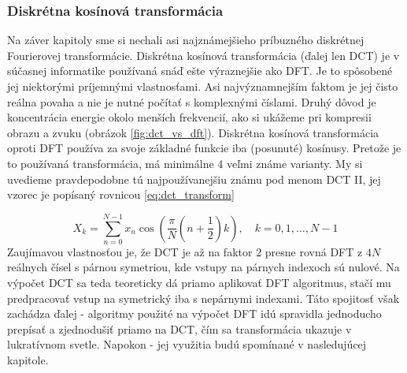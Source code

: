 \subsubsection{Diskrétna kosínová transformácia}
Na záver kapitoly sme si nechali asi najznámejšieho príbuzného
diskrétnej Fourierovej transformácie. Diskrétna kosínová transformácia
(ďalej len DCT) je v súčasnej informatike používaná snáď ešte
výraznejšie ako DFT. Je to spôsobené jej niektorými príjemnými
vlastnosťami. Asi najvýznamnejším faktom je jej čisto reálna
povaha a nie je nutné počítať s komplexnými číslami.
Druhý dôvod je koncentrácia energie okolo menších frekvencií, ako si
ukážeme pri kompresii obrazu a zvuku (obrázok \ref{fig:dct_vs_dft}).
Diskrétna kosínová transformácia oproti DFT používa za svoje
základné funkcie iba (posunuté) kosínusy.
Pretože je to používaná transformácia, má minimálne 4 veľmi známe
varianty. My si uvedieme pravdepodobne tú najpoužívanejšiu známu pod
menom DCT II, jej vzorec je popísaný rovnicou \eqref{eq:dct_transform}

\begin{equation}
    X_k = \sum_{n=0}^{N-1} x_n \cos (\frac{\pi}{N} (n + \frac{1}{2}) k),
    \quad k=0,1,\dots,N-1
    \label{eq:dct_transform}
\end{equation}
Zaujímavou vlastnosťou je, že DCT je až na faktor 2 presne rovná DFT z
$4N$ reálnych čísel s párnou symetriou, kde vstupy na párnych indexoch
sú nulové. Na výpočet DCT sa teda teoreticky dá priamo aplikovať DFT
algoritmus, stačí mu predpracovať vstup na symetrický iba s nepárnymi
indexami. Táto spojitosť však zachádza ďalej - algoritmy použité na
výpočet DFT idú spravidla jednoducho prepísať a zjednodušiť priamo na
DCT, čím sa transformácia ukazuje v lukratívnom svetle. Napokon - jej
využitia budú spomínané v nasledujúcej kapitole.

\nocite{wiki:laplace_transform}
\nocite{wiki:hartley_transform}
\nocite{wiki:z_transform}
\nocite{wiki:dct}
\nocite{bracewell}
\nocite{wolfram:z_transform}

